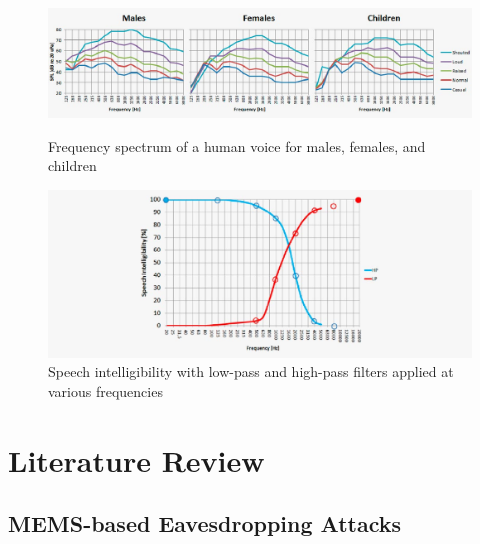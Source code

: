 \documentclass[sigconf, nonacm]{acmart}
\begin{document}
\begin{figure}[H]
\centering
\includegraphics[width=\linewidth]{embed/Speech_frequency_spectrum.jpg}
\caption{Frequency spectrum of a human voice for males, females, and children \cite{DPAMicrophonesFactsAboutSpeechIntelligibility}}
\label{fig:SpeechFrequencySpectrum}

\vspace{0.5cm}

\includegraphics[width=\linewidth]{embed/Speech_Intelligibility_Low_High_Pass_Filter.jpg}
\caption{Speech intelligibility with low-pass and high-pass filters applied at various frequencies \cite{DPAMicrophonesFactsAboutSpeechIntelligibility}}
\label{fig:SpeechIntelligibility}
\end{figure}

\section{Literature Review}
\subsection{MEMS-based Eavesdropping Attacks}
\end{document}
